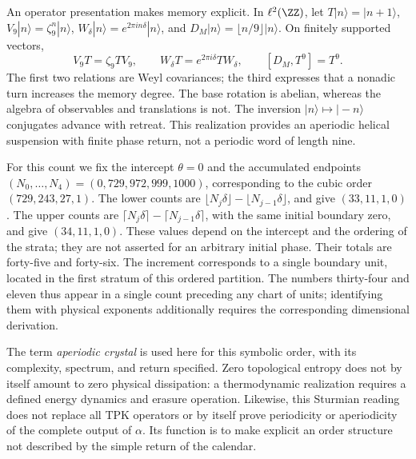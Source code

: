 An operator presentation makes memory explicit. In \(\ell^2(\ZZ)\), let \(T|n\rangle=|n+1\rangle\), \(V_9|n\rangle=\zeta_9^n|n\rangle\), \(W_\delta|n\rangle=e^{2\pi i n\delta}|n\rangle\), and \(D_M|n\rangle=\lfloor n/9\rfloor|n\rangle\). On finitely supported vectors,
\begin{equation}
 V_9T=\zeta_9TV_9,\qquad
 W_\delta T=e^{2\pi i\delta}TW_\delta,\qquad
 [D_M,T^9]=T^9.
 \label{eq:weyl-relojes}
\end{equation}
The first two relations are Weyl covariances; the third expresses that a nonadic turn increases the memory degree. The base rotation is abelian, whereas the algebra of observables and translations is not. The inversion \(|n\rangle\mapsto|-n\rangle\) conjugates advance with retreat. This realization provides an aperiodic helical suspension with finite phase return, not a periodic word of length nine.



For this count we fix the intercept \(\theta=0\) and the accumulated endpoints \((N_0,\ldots,N_4)=(0,729,972,999,1000)\), corresponding to the cubic order \((729,243,27,1)\). The lower counts are \(\lfloor N_j\delta\rfloor-\lfloor N_{j-1}\delta\rfloor\), and give \((33,11,1,0)\). The upper counts are \(\lceil N_j\delta\rceil-\lceil N_{j-1}\delta\rceil\), with the same initial boundary zero, and give \((34,11,1,0)\). These values depend on the intercept and the ordering of the strata; they are not asserted for an arbitrary initial phase. Their totals are forty-five and forty-six. The increment corresponds to a single boundary unit, located in the first stratum of this ordered partition. The numbers thirty-four and eleven thus appear in a single count preceding any chart of units; identifying them with physical exponents additionally requires the corresponding dimensional derivation.

The term \emph{aperiodic crystal} is used here for this symbolic order, with its complexity, spectrum, and return specified. Zero topological entropy does not by itself amount to zero physical dissipation: a thermodynamic realization requires a defined energy dynamics and erasure operation. Likewise, this Sturmian reading does not replace all TPK operators or by itself prove periodicity or aperiodicity of the complete output of \(\alpha\). Its function is to make explicit an order structure not described by the simple return of the calendar.




